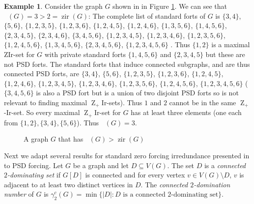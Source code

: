 \documentclass{article}
\numberwithin{figure}{section}
\numberwithin{table}{section}
\numberwithin{equation}{section}
\theoremstyle{definition}
\theoremstyle{definition}
\theoremstyle{definition}
\newtheorem{ex}[thm]{Example}
\newcommand{\Zp}{\operatorname{Z}_+}
\newcommand{\Dctwo}{\gamma^c_2}
\DeclareMathOperator{\zir}{zir}
\DeclareMathOperator{\zpir}{z_+ir}
\begin{document}
\begin{ex}    Consider the graph $G$ shown in in Figure \ref{f:z+irmorezir}. We can see that $\zpir(G)=3>2=\zir(G)$:  The complete list of  standard forts of $G$ is 
$\{3, 4\}$,
 $\{5, 6\}$,
 $\{1, 2, 3, 5\}$,
 $\{1, 2, 3, 6\}$,
 $\{1, 2, 4, 5\}$,
 $\{1, 2, 4, 6\}$,
 $\{1, 3, 5, 6\}$,
 $\{1, 4, 5, 6\}$,
 $\{2, 3, 4, 5\}$,
 $\{2, 3, 4, 6\}$,
 $\{3, 4, 5, 6\}$,
 $\{1, 2, 3, 4, 5\}$,
 $\{1, 2, 3, 4, 6\}$,
 $\{1, 2, 3, 5, 6\}$,
 $\{1, 2, 4, 5, 6\}$,
 $\{1, 3, 4, 5, 6\}$,
 $\{2, 3, 4, 5, 6\}$,
 $\{1, 2, 3, 4, 5, 6\}$ \cite{sage:irred}.  Thus $\{1,2\}$ is a maximal ZIr-set for $G$ with private standard forts $\{1, 4, 5, 6\}$ and  $\{2, 3, 4, 5\}$ but these are not PSD forts.  The standard forts that induce connected subgraphs, and are thus connected PSD forts, are 
 $\{3, 4\}$,
 $\{5, 6\}$,
 $\{1, 2, 3, 5\}$,
 $\{1, 2, 3, 6\}$,
 $\{1, 2, 4, 5\}$,
 $\{1, 2, 4, 6\}$,
 $\{1, 2, 3, 4, 5\}$,
 $\{1, 2, 3, 4, 6\}$,
 $\{1, 2, 3, 5, 6\}$,
 $\{1, 2, 4, 5, 6\}$,
 $\{1, 2, 3, 4, 5, 6\}$  ($\{3, 4, 5, 6\}$ is also a PSD fort but is a union of two disjoint PSD forts so is not relevant to finding maximal $\Zp$Ir-sets).  Thus $1$ and $2$ cannot be in the same $\Zp$-Ir-set.  So every   maximal $\Zp$Ir-set for $G$ has at least three elements (one each from $\{1,2\}, \{3,4\}, \{5,6\}$). Thus $\zpir(G)=3$. 


\begin{figure}[!h]
\centering
{}
\caption{\label{f:z+irmorezir}  A graph $G$ that has $\zpir(G)>\zir(G)$} 
\end{figure}

\end{ex}

Next we adapt several results for standard zero forcing irredundance presented in \cite{ZIR}  to PSD forcing.
 Let $G$ be a graph and let  $D\subseteq V(G)$. 
The set $D$  is a \emph{connected $2$-dominating set} if $G[D]$ is connected and for every vertex $v\in V(G)\setminus D$, $v$ is adjacent to at least two distinct vertices in $D$.  The 
\emph{connected $2$-domination number} of $G$ is $\Dctwo(G)=\min\{|D|: D\mbox{ is a connected 2-dominating set}\}$.  
\end{document}
